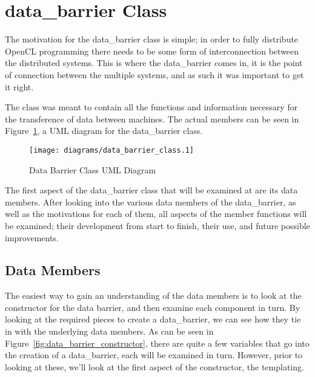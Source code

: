 \documentclass[thesis.tex]{subfiles}
\begin{document}
\section{data\_barrier Class} %

The motivation for the data\_barrier class is simple; in order to fully distribute OpenCL programming there needs to be some form of interconnection between the distributed systems. This is where the data\_barrier comes in, it is the point of connection between the multiple systems, and as such it was important to get it right.

The class was meant to contain all the functions and information necessary for the transference of data between machines. The actual members can be seen in Figure~\ref{fig:data_barrier_class}, a UML diagram for the data\_barrier class.

\begin{figure}[htbp]
  \centering
  \texttt{[image: diagrams/data\_barrier\_class.1]}
  \caption{Data Barrier Class UML Diagram}
  \label{fig:data_barrier_class}
\end{figure}

The first aspect of the data\_barrier class that will be examined at are its data members. After looking into the various data members of the data\_barrier, as well as the motivations for each of them, all aspects of the member functions will be examined; their development from start to finish, their use, and future possible improvements.

\subsection{Data Members} %
\label{sub:data_members}
  The easiest way to gain an understanding of the data members is to look at the constructor for the data barrier, and then examine each component in turn. By looking at the required pieces to create a data\_barrier, we can see how they tie in with the underlying data members. As can be seen in Figure~\ref{fig:data_barrier_constructor}, there are quite a few variables that go into the creation of a data\_barrier, each will be examined in turn. However, prior to looking at these, we'll look at the first aspect of the constructor, the templating.
\end{document}
